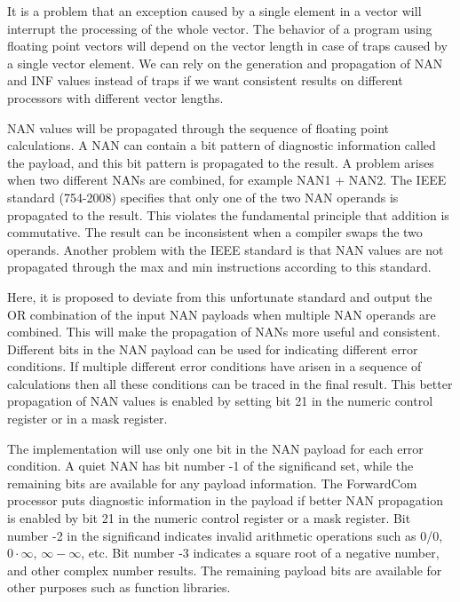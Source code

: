\documentclass[forwardcom.tex]{subfiles}
\begin{document}
It is a problem that an exception caused by a single element in a vector will interrupt the processing of the whole vector. The behavior of a program using floating point vectors will depend on the vector length in case of traps caused by a single vector element. We can rely on the generation and propagation of NAN and INF values instead of traps if we want consistent results on different processors with different vector lengths. 
\vspace{2mm}

\label{nanPropagation}
NAN values will be propagated through the sequence of floating point calculations. A NAN can contain a bit pattern of diagnostic information called the payload, and this bit pattern is propagated to the result. A problem arises when two different NANs are combined, for example NAN1 + NAN2. The IEEE standard (754-2008) specifies that only one of the two NAN operands is propagated to the result. This violates the fundamental principle that addition is commutative. The result can be inconsistent when a compiler swaps the two operands. Another problem with the IEEE standard is that NAN values are not propagated through the max and min instructions according to this standard.
\vspace{2mm}

Here, it is proposed to deviate from this unfortunate standard and output the OR combination of the input NAN payloads when multiple NAN operands are combined. This will make the propagation of NANs more useful and consistent. Different bits in the NAN payload can be used for indicating different error conditions. If multiple different error conditions have arisen in a sequence of calculations then all these conditions can be traced in the final result. This better propagation of NAN values is enabled by setting bit 21 in the numeric control register or in a mask register.
\vspace{2mm}

The implementation will use only one bit in the NAN payload for each error condition. A quiet NAN has bit number -1 of the significand set, while the remaining bits are available for any payload information. The ForwardCom processor puts diagnostic information in the payload if better NAN propagation is enabled by bit 21 in the numeric control register or a mask register. Bit number -2 in the significand indicates invalid arithmetic operations such as 0/0, $0\cdot\infty$, $\infty-\infty$, etc. Bit number -3 indicates a square root of a negative number, and other complex number results. The remaining payload bits are available for other purposes such as function libraries.
\vspace{2mm}
\end{document}
